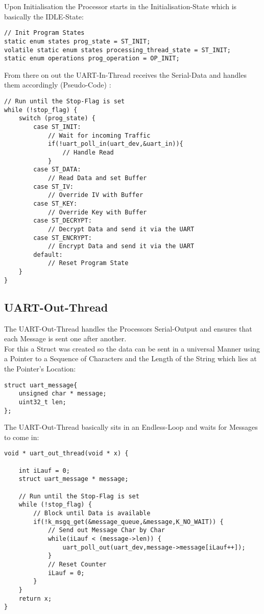 Upon Initialisation the Processor starts in the Initialisation-State which
is basically the IDLE-State:

\begin{lstlisting}
// Init Program States
static enum states prog_state = ST_INIT;
volatile static enum states processing_thread_state = ST_INIT;
static enum operations prog_operation = OP_INIT;
\end{lstlisting}

\pagebreak

From there on out the UART-In-Thread receives the Serial-Data and
handles them accordingly (Pseudo-Code) :

\begin{lstlisting}[style=CStyle,caption=State Machine Pseudo-Code]
// Run until the Stop-Flag is set
while (!stop_flag) {
	switch (prog_state) {
		case ST_INIT:
            // Wait for incoming Traffic
            if(!uart_poll_in(uart_dev,&uart_in)){
				// Handle Read
			}
	    case ST_DATA:
			// Read Data and set Buffer
	    case ST_IV:
			// Override IV with Buffer
	    case ST_KEY:
			// Override Key with Buffer
	    case ST_DECRYPT:
			// Decrypt Data and send it via the UART
	    case ST_ENCRYPT:
			// Encrypt Data and send it via the UART
	    default:
			// Reset Program State
	}
}
\end{lstlisting}

\pagebreak

\subsection{UART-Out-Thread}

The UART-Out-Thread handles the Processors Serial-Output and ensures
that each Message is sent one after another.
\\
For this a Struct was created so the data can be sent in a universal
Manner using a Pointer to a Sequence of Characters and the Length of
the String which lies at the Pointer's Location:

\begin{lstlisting}[style=CStyle,caption=Message Struct Definition]
struct uart_message{
	unsigned char * message;
	uint32_t len;
};
\end{lstlisting}

The UART-Out-Thread basically sits in an Endless-Loop and waits
for Messages to come in:

\begin{lstlisting}[style=CStyle,caption=UART Out Thread Pseudo-Code]
void * uart_out_thread(void * x) {

	int iLauf = 0;
	struct uart_message * message;

	// Run until the Stop-Flag is set
	while (!stop_flag) {
		// Block until Data is available
		if(!k_msgq_get(&message_queue,&message,K_NO_WAIT)) {
			// Send out Message Char by Char
			while(iLauf < (message->len)) {
				uart_poll_out(uart_dev,message->message[iLauf++]);
			}
			// Reset Counter
			iLauf = 0;
		}
	}
	return x;
}
\end{lstlisting}

